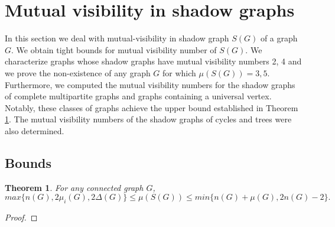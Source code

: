 \documentclass[a4paper,12pt]{article}
\newtheorem{theorem}{Theorem}[section]
\begin{document}
{\section{ Mutual visibility in shadow graphs} 
 In this section we deal with mutual-visibility in shadow graph $S(G)$ of a graph $G$. We obtain tight bounds for mutual visibility number of $S(G)$. We characterize graphs whose shadow graphs have mutual visibility numbers 2, 4 and we prove the non-existence of any graph $G$ for which $\mu(S(G))=3, 5$. Furthermore, we computed the mutual visibility numbers for the shadow graphs of complete multipartite graphs and graphs containing a universal vertex. Notably, these classes of graphs achieve the upper bound established in Theorem \ref{thm-bounds}. The mutual visibility numbers of the shadow graphs of cycles and trees were also determined.
 \subsection{Bounds}

\begin{theorem}\label{thm-bounds}
    For any connected graph $G$,
    $$max\{n(G),2\mu_{i}(G), 2\Delta(G)\} \leq \mu(S(G)) \leq min\{n(G)+\mu(G), 2n(G)-2\}.$$
\end{theorem}
\begin{proof}


\end{proof}}
\end{document}
